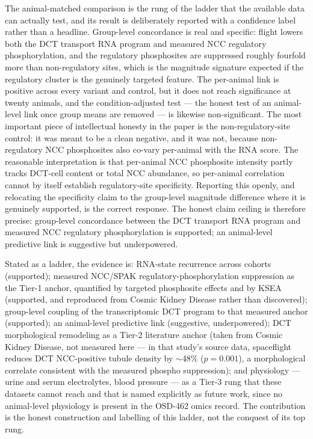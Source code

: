 \documentclass[11pt]{article}
\begin{document}
The animal-matched comparison is the rung of the ladder that the available data can actually test, and its result is deliberately reported with a confidence label rather than a headline. Group-level concordance is real and specific: flight lowers both the DCT transport RNA program and measured NCC regulatory phosphorylation, and the regulatory phosphosites are suppressed roughly fourfold more than non-regulatory sites, which is the magnitude signature expected if the regulatory cluster is the genuinely targeted feature. The per-animal link is positive across every variant and control, but it does not reach significance at twenty animals, and the condition-adjusted test --- the honest test of an animal-level link once group means are removed --- is likewise non-significant. The most important piece of intellectual honesty in the paper is the non-regulatory-site control: it was meant to be a clean negative, and it was not, because non-regulatory NCC phosphosites also co-vary per-animal with the RNA score. The reasonable interpretation is that per-animal NCC phosphosite intensity partly tracks DCT-cell content or total NCC abundance, so per-animal correlation cannot by itself establish regulatory-site specificity. Reporting this openly, and relocating the specificity claim to the group-level magnitude difference where it is genuinely supported, is the correct response. The honest claim ceiling is therefore precise: group-level concordance between the DCT transport RNA program and measured NCC regulatory phosphorylation is supported; an animal-level predictive link is suggestive but underpowered.

Stated as a ladder, the evidence is: RNA-state recurrence across cohorts (supported); measured NCC/SPAK regulatory-phosphorylation suppression as the Tier-1 anchor, quantified by targeted phosphosite effects and by KSEA (supported, and reproduced from Cosmic Kidney Disease rather than discovered); group-level coupling of the transcriptomic DCT program to that measured anchor (supported); an animal-level predictive link (suggestive, underpowered); DCT morphological remodeling as a Tier-2 literature anchor (taken from Cosmic Kidney Disease, not measured here --- in that study's source data, spaceflight reduces DCT NCC-positive tubule density by $\sim$48\% ($p=0.001$), a morphological correlate consistent with the measured phospho suppression); and physiology --- urine and serum electrolytes, blood pressure --- as a Tier-3 rung that these datasets cannot reach and that is named explicitly as future work, since no animal-level physiology is present in the OSD-462 omics record. The contribution is the honest construction and labelling of this ladder, not the conquest of its top rung.
\end{document}
